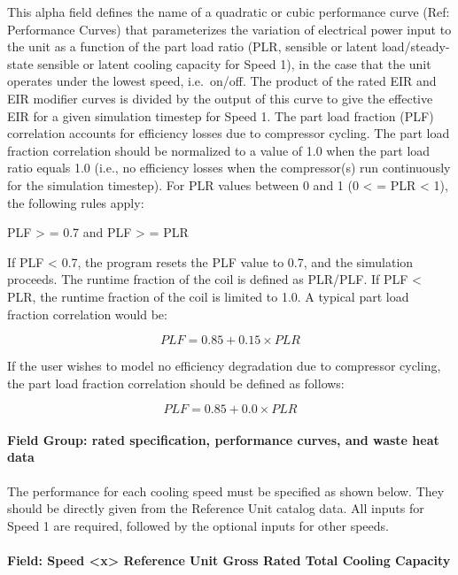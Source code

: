 This alpha field defines the name of a quadratic or cubic performance curve (Ref: Performance Curves) that parameterizes the variation of electrical power input to the unit as a function of the part load ratio (PLR, sensible or latent load/steady-state sensible or latent cooling capacity for Speed 1), in the case that the unit operates under the lowest speed, i.e.~on/off. The product of the rated EIR and EIR modifier curves is divided by the output of this curve to give the effective EIR for a given simulation timestep for Speed 1. The part load fraction (PLF) correlation accounts for efficiency losses due to compressor cycling. The part load fraction correlation should be normalized to a value of 1.0 when the part load ratio equals 1.0 (i.e., no efficiency losses when the compressor(s) run continuously for the simulation timestep). For PLR values between 0 and 1 (0 \textless{} = PLR \textless{} 1), the following rules apply:

PLF \textgreater{} = 0.7 and PLF \textgreater{} = PLR

If PLF \textless{} 0.7, the program resets the PLF value to 0.7, and the simulation proceeds. The runtime fraction of the coil is defined as PLR/PLF. If PLF \textless{} PLR, the runtime fraction of the coil is limited to 1.0. A typical part load fraction correlation would be:

\begin{equation}
PLF = 0.85 + 0.15 \times PLR
\end{equation}

If the user wishes to model no efficiency degradation due to compressor cycling, the part load fraction correlation should be defined as follows:

\begin{equation}
PLF = 0.85 + 0.0 \times PLR
\end{equation}

\paragraph{Field Group: rated specification, performance curves, and waste heat data}\label{field-group-rated-specification-performance-curves-and-waste-heat-data-1}

The performance for each cooling speed must be specified as shown below. They should be directly given from the Reference Unit catalog data. All inputs for Speed 1 are required, followed by the optional inputs for other speeds.

\paragraph{Field: Speed \textless{}x\textgreater{} Reference Unit Gross Rated Total Cooling Capacity}\label{field-speed-x-reference-unit-gross-rated-total-cooling-capacity-1}

